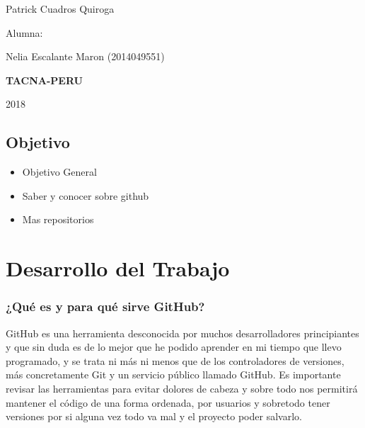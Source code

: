 \documentclass[12pt,letterpaper]{article}
\begin{document}
\begin{titlepage}
\begin{center}
\vspace*{0.1in}
\begin{large}
 Patrick Cuadros Quiroga\\
\end{large}

\vspace*{0.2in}
\vspace*{0.1in}
\begin{large}
Alumna: \\
\begin{flushleft}
Nelia Escalante Maron	           \hfill	(2014049551) \\
\end{flushleft}
\end{large}

\vspace*{0.3in}
\begin{Large}
\textbf{TACNA-PERU} \\
\end{Large}

\vspace*{0.1in}
\begin{large}
2018\\
\end{large}

\end{center}

\end{titlepage}

\vspace*{0.8in}
\begin{Large}
\part{Objetivo}
\begin{itemize}
\item Objetivo General
\item Saber y conocer sobre github 
\item Mas repositorios \\
\end{itemize}
\end{Large}

\vspace*{0.8in}
\part{Desarrollo del Trabajo}

\section{¿Qué es y para qué sirve GitHub?}
GitHub es una herramienta desconocida por muchos desarrolladores principiantes y que sin duda es de lo mejor que he podido aprender en mi tiempo que llevo programado, y se trata ni más ni menos que de los controladores de versiones, más concretamente Git y un servicio público llamado GitHub. Es importante revisar las herramientas para evitar dolores de cabeza y sobre todo nos permitirá mantener el código de una forma ordenada, por usuarios y sobretodo tener versiones por si alguna vez todo va mal y el proyecto poder salvarlo. 
\end{document}
